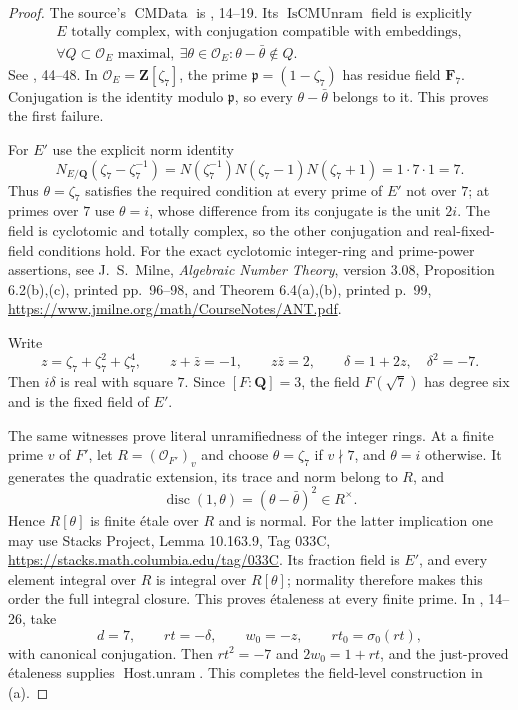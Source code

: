 \documentclass[11pt,a4paper]{article}
\theoremstyle{definition}\newtheorem{remark}[theorem]{Remark}
\begin{document}
\begin{proof}
The source's $\operatorname{CMData}$ is
, 14--19.
Its $\operatorname{IsCMUnram}$ field is explicitly
\[
 \begin{gathered}
 E\text{ totally complex, with conjugation compatible with embeddings},
 \\
 \forall Q\subset\mathcal O_E\text{ maximal},\
       \exists\theta\in\mathcal O_E:
                    \theta-\bar\theta\notin Q.
 \end{gathered}
\]
See , 44--48.
In $\mathcal O_E=\mathbf Z[\zeta _7]$, the prime
$\mathfrak p=(1-\zeta _7)$ has residue field $\mathbf F_7$.
Conjugation is the identity modulo $\mathfrak p$, so every
$\theta-\bar\theta$ belongs to it. This proves the first failure.

For $E'$ use the explicit norm identity
\[
 N_{E/\mathbf Q}(\zeta _7-\zeta _7^{-1})
 =N(\zeta _7^{-1})N(\zeta _7-1)N(\zeta _7+1)
 =1\cdot7\cdot1=7.
\]
Thus $\theta=\zeta _7$ satisfies the required condition at every
prime of $E'$ not over $7$; at primes over $7$ use $\theta=i$,
whose difference from its conjugate is the unit $2i$.
The field is cyclotomic and totally complex, so the other
conjugation and real-fixed-field conditions hold.
For the exact cyclotomic integer-ring and prime-power assertions,
see J.\ S.\ Milne, \emph{Algebraic Number Theory}, version 3.08,
Proposition 6.2(b),(c), printed pp.~96--98,
and Theorem 6.4(a),(b), printed p.~99,
\url{https://www.jmilne.org/math/CourseNotes/ANT.pdf}.

Write
\[
 z=\zeta _7+\zeta _7^2+\zeta _7^4,\qquad
 z+\bar z=-1,\qquad z\bar z=2,\qquad
 \delta=1+2z,\quad\delta^2=-7.
\]
Then $i\delta$ is real with square $7$.
Since $[F:\mathbf Q]=3$, the field $F(\sqrt7)$ has degree six
and is the fixed field of $E'$.

The same witnesses prove literal unramifiedness of the integer rings.
At a finite prime $v$ of $F'$, let $R=(\mathcal O_{F'})_v$ and
choose $\theta=\zeta _7$ if $v\nmid7$, and $\theta=i$ otherwise.
It generates the quadratic extension, its trace and norm belong to $R$,
and
\[
 \operatorname{disc}(1,\theta)=(\theta-\bar\theta)^2\in R^\times.
\]
Hence $R[\theta]$ is finite étale over $R$ and is normal.
For the latter implication one may use Stacks Project,
Lemma 10.163.9, Tag 033C,
\url{https://stacks.math.columbia.edu/tag/033C}.
Its fraction field is $E'$, and every element integral over $R$
is integral over $R[\theta]$; normality therefore makes this order the
full integral closure. This proves étaleness at every finite prime.
In
,
14--26, take
\[
 d=7,\qquad rt=-\delta,\qquad w_0=-z,\qquad
 rt_0=\sigma_0(rt),
\]
with canonical conjugation. Then $rt^2=-7$ and $2w_0=1+rt$,
and the just-proved étaleness supplies $\operatorname{Host.unram}$.
This completes the field-level construction in (a).


\end{proof}
\end{document}
